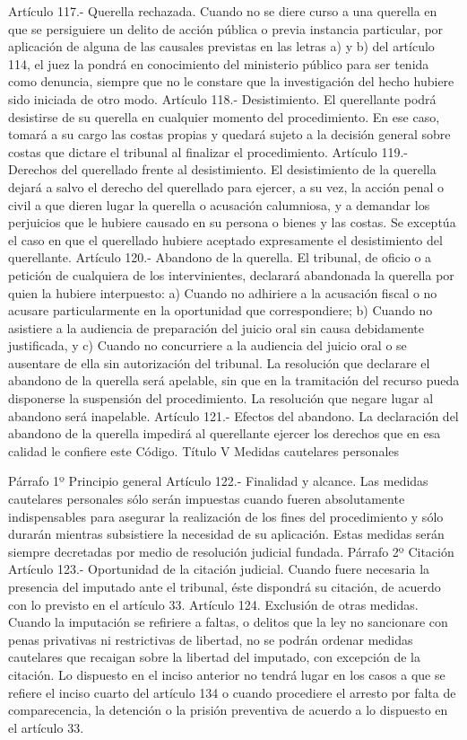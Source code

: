     Artículo 117.- Querella rechazada. Cuando no se diere curso a una querella en que se persiguiere un delito de acción pública o previa instancia particular, por aplicación de alguna de las causales previstas en las letras a) y b) del artículo 114, el juez la pondrá en conocimiento del ministerio público para ser tenida como denuncia, siempre que no le constare que la investigación del hecho hubiere sido iniciada de otro modo.
    Artículo 118.- Desistimiento. El querellante podrá desistirse de su querella en cualquier momento del procedimiento. En ese caso, tomará a su cargo las costas propias y quedará sujeto a la decisión general sobre costas que dictare el tribunal al finalizar el procedimiento.
    Artículo 119.- Derechos del querellado frente al desistimiento. El desistimiento de la querella dejará a salvo el derecho del querellado para ejercer, a su vez, la acción penal o civil a que dieren lugar la querella o acusación calumniosa, y a demandar los perjuicios que le hubiere causado en su persona o bienes y las costas.
    Se exceptúa el caso en que el querellado hubiere aceptado expresamente el desistimiento del querellante.
    Artículo 120.- Abandono de la querella. El tribunal, de oficio o a petición de cualquiera de los intervinientes, declarará abandonada la querella por quien la hubiere interpuesto:
    a) Cuando no adhiriere a la acusación fiscal o no acusare particularmente en la oportunidad que correspondiere;
    b) Cuando no asistiere a la audiencia de preparación del juicio oral sin causa debidamente justificada, y
    c) Cuando no concurriere a la audiencia del juicio oral o se ausentare de ella sin autorización del tribunal.
    La resolución que declarare el abandono de la querella será apelable, sin que en la tramitación del recurso pueda disponerse la suspensión del procedimiento. La resolución que negare lugar al abandono será inapelable.
    Artículo 121.- Efectos del abandono. La declaración del abandono de la querella impedirá al querellante ejercer los derechos que en esa calidad le confiere este Código.
    Título V
    Medidas cautelares personales

    Párrafo 1º Principio general
    Artículo 122.- Finalidad y alcance. Las medidas cautelares personales sólo serán impuestas cuando fueren absolutamente indispensables para asegurar la realización de los fines del procedimiento y sólo durarán mientras subsistiere la necesidad de su aplicación.
    Estas medidas serán siempre decretadas por medio de resolución judicial fundada.
    Párrafo 2º Citación
    Artículo 123.- Oportunidad de la citación judicial. Cuando fuere necesaria la presencia del imputado ante el tribunal, éste dispondrá su citación, de acuerdo con lo previsto en el artículo 33.
    Artículo 124. Exclusión de otras medidas. Cuando la imputación se refiriere a faltas, o delitos que la ley no sancionare con penas privativas ni restrictivas de libertad, no se podrán ordenar medidas cautelares que recaigan sobre la libertad del imputado, con excepción de la citación.
    Lo dispuesto en el inciso anterior no tendrá lugar en los casos a que se refiere el inciso cuarto del artículo 134 o cuando procediere el arresto por falta de comparecencia, la detención o la prisión preventiva de acuerdo a lo dispuesto en el artículo 33.


